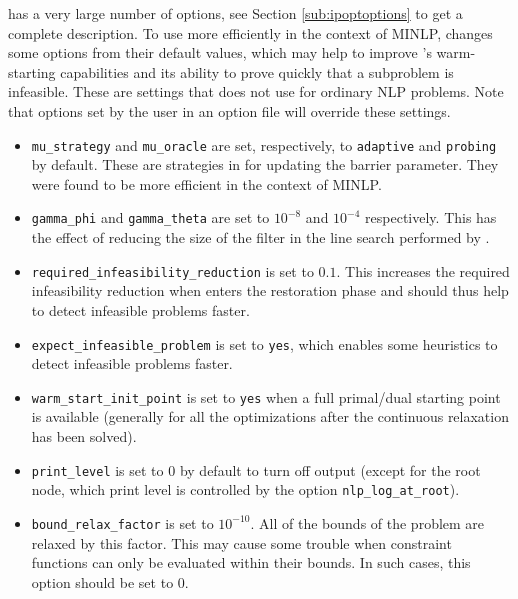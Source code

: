 \IPOPT has a very large number of options, see Section \ref{sub:ipoptoptions} to get a complete description.
To use \IPOPT more efficiently in the context of MINLP,
\BONMIN changes some \IPOPT options from their default values, which may help to improve \IPOPT's warm-starting capabilities and its ability to prove quickly that a subproblem is infeasible.
These are settings that \IPOPT does not use for ordinary NLP problems.
Note that options set by the user in an option file will override these settings.
\begin{itemize}
\vspace{-2ex}
\setlength{\partopsep}{0pt}
\setlength{\itemsep}{0pt}
\setlength{\parskip}{.5ex}
\item {\tt mu\_strategy} and {\tt mu\_oracle} are set, respectively, to
{\tt adaptive} and {\tt probing} by default. These are strategies in \IPOPT
for updating the barrier parameter. They were found to be more efficient in the context of MINLP.

\item {\tt gamma\_phi} and {\tt gamma\_theta} are set to $10^{-8}$ and $10^{-4}$ respectively.
This has the effect of reducing the size of the filter in the line search performed by \IPOPT.

\item {\tt required\_infeasibility\_reduction} is set to $0.1$.
This increases the required infeasibility reduction when \IPOPT enters the
restoration phase and should thus help to detect infeasible problems faster.

\item {\tt expect\_infeasible\_problem} is set to {\tt yes}, which enables some heuristics
to detect infeasible problems faster.

\item {\tt warm\_start\_init\_point} is set to {\tt yes} when a full primal/dual starting
point is available (generally for all the optimizations after the continuous relaxation has been solved).

\item {\tt print\_level} is set to $0$ by default to turn off \IPOPT output (except for the root node, which print level is controlled by the \BONMIN option \texttt{nlp\_log\_at\_root}).

\item \texttt{bound\_relax\_factor} is set to $10^{-10}$. All of the bounds
of the problem are relaxed by this factor. This may cause some trouble
when constraint functions can only be evaluated within their bounds.
In such cases, this option should be set to $0$.
\end{itemize}

